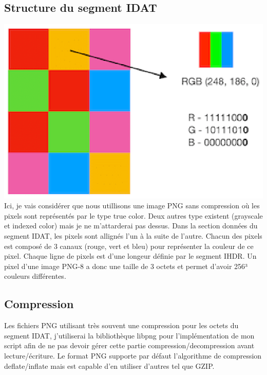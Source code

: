 \subsection{Structure du segment IDAT}
\includegraphics[width=1\textwidth]{img/RGB-png-bit-pixel-mode.eps}
Ici, je vais considérer que nous utillisons une image PNG sans compression où les pixels sont représentés par le type true color. Deux autres type existent (grayscale et indexed color) mais je ne m'attarderai pas dessus.
\newline
Dans la section données du segment IDAT, les pixels sont allignés l'un à la suite de l'autre. Chacun des pixels est composé de 3 canaux (rouge, vert et bleu) pour représenter la couleur de ce pixel. Chaque ligne de pixels est d'une longeur définie par le segment IHDR.
\newline
Un pixel d'une image PNG-8 a donc une taille de 3 octets et permet d'avoir 256³ couleurs différentes.
\subsection{Compression}
Les fichiers PNG utilisant très souvent une compression pour les octets du segment IDAT, j'utiliserai la bibliothèque libpng pour l'implémentation de mon script afin de ne pas devoir gérer cette partie compression/decompression avant lecture/écriture.
\newline
Le format PNG supporte par défaut l'algorithme de compression deflate/inflate mais est capable d'en utiliser d'autres tel que GZIP.
~\cite{pngStructure}
~\cite{pngChunkInspector}
